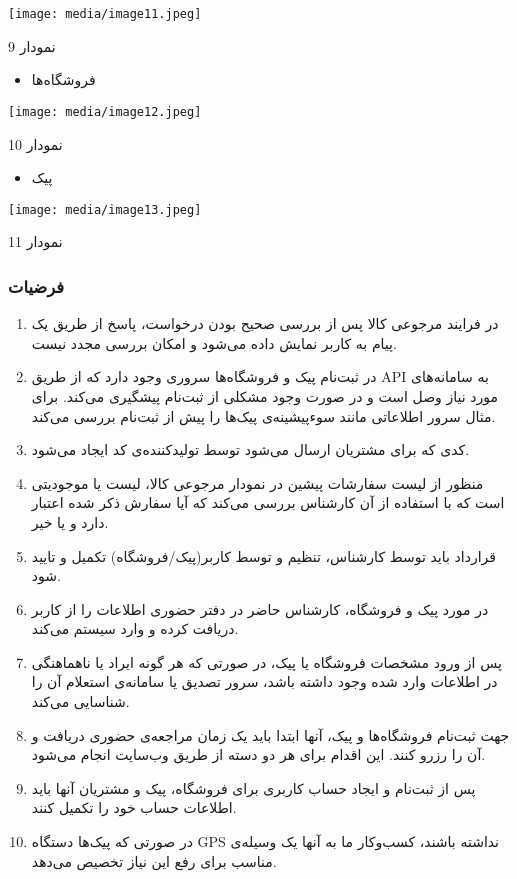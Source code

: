\documentclass[]{article}
\begin{document}
\texttt{[image: media/image11.jpeg]}

نمودار 9

\begin{itemize}
\item
  فروشگاه‌ها
\end{itemize}

\texttt{[image: media/image12.jpeg]}

نمودار 10

\begin{itemize}
\item
  پیک
\end{itemize}

\texttt{[image: media/image13.jpeg]}

نمودار 11

\subsubsection{فرضیات}\label{ux641ux631ux636ux6ccux627ux62a-1}

\begin{enumerate}
\def\labelenumi{\arabic{enumi})}
\item
  در فرایند مرجوعی کالا پس از بررسی صحیح بودن درخواست، پاسخ از طریق یک
  پیام به کاربر نمایش داده می‌شود و امکان بررسی مجدد نیست.
\item
  در ثبت‌نام پیک و فروشگاه‌ها سروری وجود دارد که از طریق API به
  سامانه‌های مورد نیاز وصل است و در صورت وجود مشکلی از ثبت‌نام پیشگیری
  می‌کند. برای مثال سرور اطلاعاتی مانند سوءپیشینه‌ی پیک‌ها را پیش از
  ثبت‌نام بررسی می‌کند.
\item
  کدی که برای مشتریان ارسال می‌شود توسط تولید‌کننده‌ی کد ایجاد می‌شود.
\item
  منظور از لیست سفارشات پیشین در نمودار مرجوعی کالا، لیست یا موجودیتی
  است که با استفاده از آن کارشناس بررسی می‌کند که آیا سفارش ذکر شده
  اعتبار دارد و یا خیر.
\item
  قرارداد باید توسط کارشناس، تنظیم و توسط کاربر(پیک/فروشگاه) تکمیل و
  تایید شود.
\item
  در مورد پیک و فروشگاه، کارشناس حاضر در دفتر حضوری اطلاعات را از کاربر
  دریافت کرده و وارد سیستم می‌کند.
\item
  پس از ورود مشخصات فروشگاه یا پیک، در صورتی که هر گونه ایراد یا
  ناهماهنگی در اطلاعات وارد شده وجود داشته باشد، سرور تصدیق یا سامانه‌ی
  استعلام آن را شناسایی می‌کند.
\item
  جهت ثبت‌نام فروشگاه‌ها و پیک، آنها ابتدا باید یک زمان مراجعه‌ی حضوری
  دریافت و آن را رزرو کنند. این اقدام برای هر دو دسته از طریق وب‌سایت
  انجام می‌شود.
\item
  پس از ثبت‌نام و ایجاد حساب کاربری برای فروشگاه، پیک و مشتریان آنها
  باید اطلاعات حساب خود را تکمیل کنند.
\item
  در صورتی که پیک‌ها دستگاه GPS نداشته باشند، کسب‌وکار ما به آنها یک
  وسیله‌ی مناسب برای رفع این نیاز تخصیص می‌دهد.
\end{enumerate}
\end{document}
